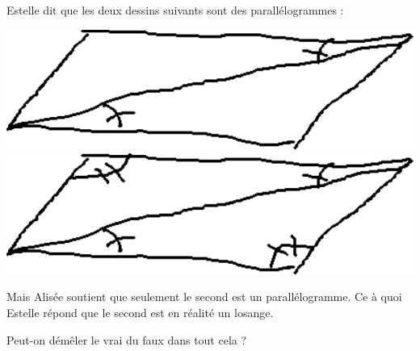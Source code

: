 
\begin{exercice}\label{exo2smath-0178}

    Estelle dit que les deux dessins suivants sont des parallélogrammes :
    \begin{center}
    \includegraphics[width=\linewidth]{codage_parall1.pdf}      %
    \includegraphics[width=\linewidth]{codage_parall2.pdf}
    \end{center}
    Mais Alisée soutient que seulement le second est un parallélogramme. Ce à quoi Estelle répond que le second est en réalité un losange.

    Peut-on démêler le vrai du faux dans tout cela ?

\end{exercice}
